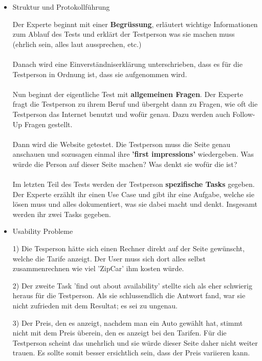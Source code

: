\begin{itemize}

    \item Struktur und Protokollführung
    
    Der Experte beginnt mit einer \textbf{Begrüssung}, erläutert wichtige Informationen
    zum Ablauf des Tests und erklärt der Testperson was sie machen muss (ehrlich sein,
    alles laut aussprechen, etc.)
    \\ \\
    Danach wird eine Einverständniserklärung unterschrieben, dass es für die
    Testperson in Ordnung ist, dass sie aufgenommen wird.
    \\ \\
    Nun beginnt der eigentliche Test mit \textbf{allgemeinen Fragen}. Der Experte fragt die
    Testperson zu ihrem Beruf und übergeht dann zu Fragen, wie oft die Testperson
    das Internet benutzt und wofür genau. Dazu werden auch Follow-Up Fragen gestellt. 
    \\ \\
    Dann wird die Website getestet. Die Testperson muss die Seite genau anschauen und 
    sozusagen einmal ihre \textbf{'first impressions'} wiedergeben. Was würde die Person auf dieser
    Seite machen? Was denkt sie wofür die ist?
    \\ \\
    Im letzten Teil des Tests werden der Testperson \textbf{spezifische Tasks} gegeben. Der Experte
    erzählt ihr einen Use Case und gibt ihr eine Aufgabe, welche sie lösen muss und alles
    dokumentiert, was sie dabei macht und denkt. Insgesamt werden ihr zwei Tasks gegeben. 

    \item Usability Probleme
    
    1) Die Tesperson hätte sich einen Rechner direkt auf der Seite gewünscht, welche
    die Tarife anzeigt. Der User muss sich dort alles selbst zusammenrechnen
    wie viel 'ZipCar' ihm kosten würde.

    2) Der zweite Task 'find out about availability' stellte sich als eher schwierig heraus 
    für die Testperson. Als sie schlussendlich die Antwort fand, war sie nicht zufrieden mit 
    dem Resultat; es sei zu ungenau.

    3) Der Preis, den es anzeigt, nachdem man ein Auto gewählt hat, stimmt nicht mit
    dem Preis überein, den es anzeigt bei den Tarifen. Für die Testperson scheint das
    unehrlich und sie würde dieser Seite daher nicht weiter trauen. Es sollte somit 
    besser ersichtlich sein, dass der Preis variieren kann.
    
\end{itemize}